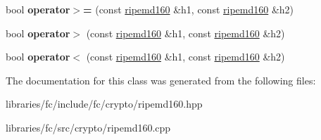 \begin{DoxyCompactItemize}
bool {\bfseries operator$>$=} (const \mbox{\hyperlink{classfc_1_1ripemd160}{ripemd160}} \&h1, const \mbox{\hyperlink{classfc_1_1ripemd160}{ripemd160}} \&h2)
\item 
\mbox{\label{classfc_1_1ripemd160_a25b1386a28903dfa8b3ffcf275feb2c1}} 
bool {\bfseries operator$>$} (const \mbox{\hyperlink{classfc_1_1ripemd160}{ripemd160}} \&h1, const \mbox{\hyperlink{classfc_1_1ripemd160}{ripemd160}} \&h2)
\item 
\mbox{\label{classfc_1_1ripemd160_a3ef6c695d63dd7d636c8540e40f96d08}} 
bool {\bfseries operator$<$} (const \mbox{\hyperlink{classfc_1_1ripemd160}{ripemd160}} \&h1, const \mbox{\hyperlink{classfc_1_1ripemd160}{ripemd160}} \&h2)
\end{DoxyCompactItemize}


The documentation for this class was generated from the following files\+:\begin{DoxyCompactItemize}
\item 
libraries/fc/include/fc/crypto/ripemd160.\+hpp\item 
libraries/fc/src/crypto/ripemd160.\+cpp\end{DoxyCompactItemize}
